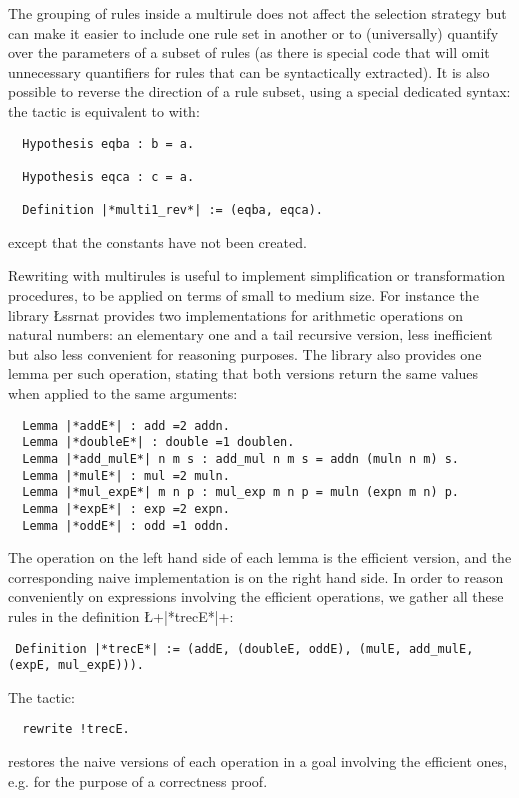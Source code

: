 The grouping of rules inside a multirule does not affect the selection
strategy but can make it easier to include one rule set in another or
to (universally) quantify over the parameters of a subset of rules (as
there is special code that will omit unnecessary quantifiers for rules that
can be syntactically extracted). It is also possible to
reverse the direction of a rule subset, using a special dedicated syntax:
the tactic  is equivalent to
 with:
\begin{lstlisting}
  Hypothesis eqba : b = a.

  Hypothesis eqca : c = a.

  Definition |*multi1_rev*| := (eqba, eqca).
\end{lstlisting}
except that the constants  have not been created.

Rewriting with multirules
is useful to implement simplification or transformation
procedures, to be applied on terms of small to medium size. For
instance the library \L{ssrnat} provides two implementations for
arithmetic operations on natural numbers: an elementary one and a tail
recursive version, less inefficient but also less convenient for
reasoning purposes. The library also provides one lemma per such
operation, stating that both versions return the same values when
applied to the same arguments:

\begin{lstlisting}
  Lemma |*addE*| : add =2 addn.
  Lemma |*doubleE*| : double =1 doublen.
  Lemma |*add_mulE*| n m s : add_mul n m s = addn (muln n m) s.
  Lemma |*mulE*| : mul =2 muln.
  Lemma |*mul_expE*| m n p : mul_exp m n p = muln (expn m n) p.
  Lemma |*expE*| : exp =2 expn.
  Lemma |*oddE*| : odd =1 oddn.
\end{lstlisting}

The operation on the left hand side of each lemma is the efficient
version, and the corresponding naive implementation is on the right
hand side. In order to reason conveniently on expressions involving
the efficient operations, we gather all these rules in the
definition \L+|*trecE*|+:
\begin{lstlisting}
 Definition |*trecE*| := (addE, (doubleE, oddE), (mulE, add_mulE, (expE, mul_expE))).
\end{lstlisting}
The tactic:
\begin{lstlisting}
  rewrite !trecE.
\end{lstlisting}
restores the naive versions of each operation in a goal involving the
efficient ones, e.g. for the purpose of a correctness proof.

